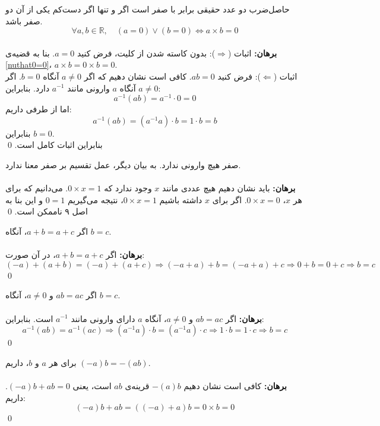 \begin{theorem}
	حاصل‌ضرب دو عدد حقیقی برابر با صفر است اگر و تنها اگر دست‌کم یکی از آن دو صفر باشد.
	$$\forall a,b \in \mathbb{R} ,\quad (a=0) \vee (b=0) \iff a \times b=0$$
	\dfth \\ \textbf{برهان:}
	اثبات
	($\Rightarrow$):
	بدون کاسته شدن از کلیت، فرض کنید
	$a=0$.
	بنا به قضیه‌ی
	\ref{nuthat0=0}،
	$a \times b = 0 \times b = 0$. \\
	اثبات
	($\Leftarrow$):
	فرض کنید
	$ab=0$.
	کافی است نشان دهیم که اگر
	$a \neq 0$
	آنگاه
	$b=0$.
	اگر
	$a \neq 0$
	آنگاه $a$ وارونی مانند
	$a^{-1}$
	دارد. بنابراین:
	$$a^{-1}(ab) = a^{-1} \cdot 0 = 0$$
	اما از طرفی داریم:
	$$a^{-1}(ab) = (a^{-1}a) \cdot b = 1 \cdot b = b$$
	بنابراین
	$b=0$. \\
	بنابراین اثبات کامل است.
	\qed
\end{theorem}

\begin{theorem}
	صفر هیچ وارونی ندارد. به بیان دیگر، عمل تقسیم بر صفر معنا ندارد.
	\\ \dfth \\ \textbf{برهان:}
	باید نشان دهیم هیچ عددی مانند $x$ وجود ندارد که
	$0 \times x = 1$.
	می‌دانیم که برای هر $x$،
	$0 \times x = 0$.
	اگر برای $x$ داشته باشیم
	$0 \times x = 1$،
	نتیجه می‌گیریم
	$0=1$
	و این بنا به اصل ۹ ناممکن است.
	\qed
\end{theorem}

\begin{theorem}
	اگر
	$a+b=a+c$،
	آنگاه
	$b=c$.
	\\ \dfth \\ \textbf{برهان:}
	اگر
	$a+b=a+c$،
	در آن صورت:
	$$(-a)+(a+b)=(-a)+(a+c) \Rightarrow (-a+a)+b=(-a+a)+c \Rightarrow 0+b=0+c \Rightarrow b=c$$
	\qed
\end{theorem}

\begin{theorem}
	اگر
	$ab=ac$ و $a \neq 0$،
	آنگاه
	$b=c$.
	\\ \dfth \\ \textbf{برهان:}
	اگر
	$ab=ac$ و $a \neq 0$،
	آنگاه $a$ دارای وارونی مانند
	$a^{-1}$
	است. بنابراین:
	$$a^{-1}(ab)=a^{-1}(ac) \Rightarrow (a^{-1}a) \cdot b = (a^{-1}a) \cdot c \Rightarrow 1 \cdot b=1 \cdot c \Rightarrow b=c$$
	\qed
\end{theorem}

\begin{theorem}
	برای هر $a$ و $b$، داریم
	$(-a)b = -(ab)$.
	\\ \dfth \\ \textbf{برهان:}
	کافی است نشان دهیم
	$-(a)b$
	قرینه‌ی
	$ab$
	است، یعنی
	$(-a)b+ab=0$.
	داریم:
	$$(-a)b+ab = ((-a)+a)b = 0 \times b = 0$$
	\qed
\end{theorem}

